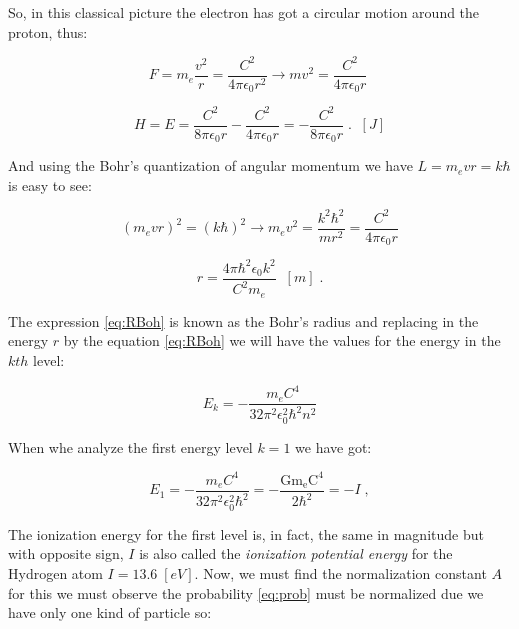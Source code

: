 \documentclass[spanish,notitlepage,letterpaper,11pt]{article} %
\numberwithin{equation}{subsection}
\begin{document}
        So, in this classical picture the electron has got a circular motion around the proton, thus:

        \begin{equation*}
            F = m_e\frac{v^2}{r} = \frac{C^2}{4\pi\epsilon_0r^2} \rightarrow mv^2 = \frac{C^2}{4\pi\epsilon_0r}\;
        \end{equation*}

        \begin{equation}
            H = E = \frac{C^2}{8\pi\epsilon_0r} - \frac{C^2}{4\pi\epsilon_0 r} = -\frac{C^2}{8\pi\epsilon_0r}\;. \;\; [J]
        \end{equation}

        And using the Bohr's quantization of angular momentum we have $L = m_evr = k\hbar$ is easy to see:

        \begin{equation*}
            (m_evr)^2 = (k\hbar)^2 \rightarrow m_ev^2 = \frac{k^2\hbar^2}{mr^2} = \frac{C^2}{4\pi\epsilon_0r}
        \end{equation*}

        \begin{equation}\label{eq:RBoh}
            r = \frac{4\pi\hbar^2\epsilon_0k^2}{C^2m_e} \;\;[m]\;.
        \end{equation}

        The expression \ref{eq:RBoh} is known as the Bohr's radius and replacing in the energy $r$ by the equation \ref{eq:RBoh}  we will have the values for the energy in the $kth$ level:

        \begin{equation}
            E_k = -\frac{m_eC^4}{32\pi^2\epsilon_0^2\hbar^2n^2}
        \end{equation}

    When whe analyze the first energy level $k = 1$ we have got:

    \begin{equation*}
        E_1 = -\frac{m_eC^4}{32\pi^2\epsilon_0^2\hbar^2} = -\frac{\mathrm{Gm_eC^4}}{2\hbar^2} = -I\;,
    \end{equation*}

    The ionization energy for the first level is, in fact, the same in magnitude but with opposite sign, $I$ is also called the \textit{ionization potential energy} for the Hydrogen atom $I = 13.6\;[eV]$. Now, we must find the normalization constant $A$ for this we must observe the probability \ref{eq:prob} must be normalized due we have only one kind of particle so:
\end{document}

